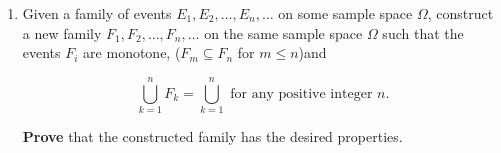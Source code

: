 \documentclass{article}
\begin{document}
\begin{enumerate}
\item

Given a family of events $E_1, E_2, \dots , E_n, \dots$ on some sample space $\Omega$, construct a new
family $F_1, F_2, \dots ,F_n, \dots$ on the same sample space $\Omega$ such that the events $F_i$ are
monotone, ($F_m \subseteq F_n$ for $m \leq n$)and

$$ \bigcup_{k=1}^n F_k = \bigcup_{k=1}^n \text{ for any positive integer } n.$$

{\bf Prove} that the constructed family has the desired properties.

\end{enumerate}
\end{document}
